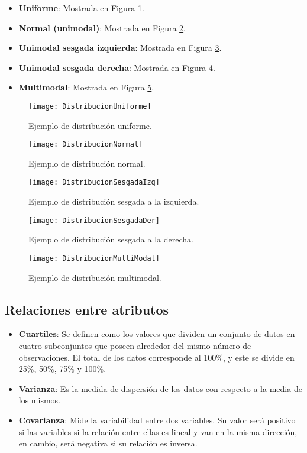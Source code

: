 \begin{itemize}
	\item \textbf{Uniforme}: Mostrada en Figura \ref{Fig: DistUni}.
	\item \textbf{Normal (unimodal)}: Mostrada en Figura \ref{Fig: DistNor}.
	\item \textbf{Unimodal sesgada izquierda}: Mostrada en Figura \ref{Fig: DistSIz}.
	\item \textbf{Unimodal sesgada derecha}: Mostrada en Figura \ref{Fig: DistSDe}.
	\item \textbf{Multimodal}: Mostrada en Figura \ref{Fig: DistMul}.
\end{itemize}

\begin{figure}[htbp]
	\centering
	\texttt{[image: DistribucionUniforme]}
	\caption{Ejemplo de distribución uniforme.}
	\label{Fig: DistUni}
\end{figure}

\begin{figure}[htbp]
	\centering
	\texttt{[image: DistribucionNormal]}
	\caption{Ejemplo de distribución normal.}
	\label{Fig: DistNor}
\end{figure}

\begin{figure}[htbp]
	\centering
	\texttt{[image: DistribucionSesgadaIzq]}
	\caption{Ejemplo de distribución sesgada a la izquierda.}
	\label{Fig: DistSIz}
\end{figure}

\begin{figure}[htbp]
	\centering
	\texttt{[image: DistribucionSesgadaDer]}
	\caption{Ejemplo de distribución sesgada a la derecha.}
	\label{Fig: DistSDe}
\end{figure}

\begin{figure}[htbp]
	\centering
	\texttt{[image: DistribucionMultiModal]}
	\caption{Ejemplo de distribución multimodal.}
	\label{Fig: DistMul}
\end{figure}

\subsection{Relaciones entre atributos}
\begin{itemize}
	\item \textbf{Cuartiles}: Se definen como los valores que dividen un conjunto de datos en cuatro subconjuntos que poseen alrededor del mismo número de observaciones. El total de los datos corresponde al 100\%, y este se divide en 25\%, 50\%, 75\% y 100\%. \cite{Economipedia}
	\item \textbf{Varianza}: Es la medida de dispersión de los datos con respecto a la media de los mismos. \cite{IAnet20201}
	\item \textbf{Covarianza}: Mide la variabilidad entre dos variables. Su valor será positivo si las variables si la relación entre ellas es lineal y van en la misma dirección, en cambio, será negativa si su relación es inversa. \cite{IAnet20202}
\end{itemize}

